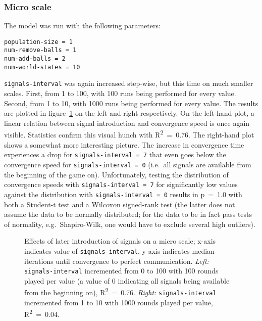 \documentclass[
	DIV=calc,
	BCOR=0mm,
	pagesize,
]{scrartcl}
\newcommand{\code}[1]{\texttt{#1}}
\begin{document}
\subsubsection*{Micro scale}
The model was run with the following parameters:
\begin{verbatim}
population-size = 1
num-remove-balls = 1
num-add-balls = 2
num-world-states = 10
\end{verbatim}
\code{signals-interval} was again increased step-wise, but this time on much smaller scales.
First, from 1 to 100, with 100 runs being performed for every value.
Second, from 1 to 10, with 1000 runs being performed for every value.
The results are plotted in figure~\ref{fig:sigmicro} on the left and right respectively.
On the left-hand plot, a linear relation between signal introduction and convergence speed is once again visible.
Statistics confirm this visual hunch with R\textsuperscript{2}~=~0.76.
The right-hand plot shows a somewhat more interesting picture.
The increase in convergence time experiences a drop for \code{signals-interval~=~7} that even goes below the convergence speed for \code{signals-interval~=~0} (i.e.~all signals are available from the beginning of the game on).
Unfortunately, testing the distribution of convergence speeds with \code{signals-interval~=~7} for significantly low values against the distribution with \code{signals-interval~=~0} results in p~=~1.0 with both a Student-t test and a Wilcoxon signed-rank test (the latter does not assume the data to be normally distributed; for the data to be in fact pass tests of normality, e.g.~Shapiro-Wilk, one would have to exclude several high outliers).

\begin{figure}
	\centering
	\caption{Effects of later introduction of signals on a micro scale; x-axis indicates value of \code{signals-interval}, y-axis indicates median iterations until convergence to perfect communication. \emph{Left:} \code{signals-interval} incremented from 0 to 100 with 100 rounds played per value (a value of 0 indicating all signals being available from the beginning on), R\textsuperscript{2}~=~0.76. \emph{Right:} \code{signals-interval} incremented from 1 to 10 with 1000 rounds played per value, R\textsuperscript{2}~=~0.04.}
	\label{fig:sigmicro}
\end{figure}
\end{document}
